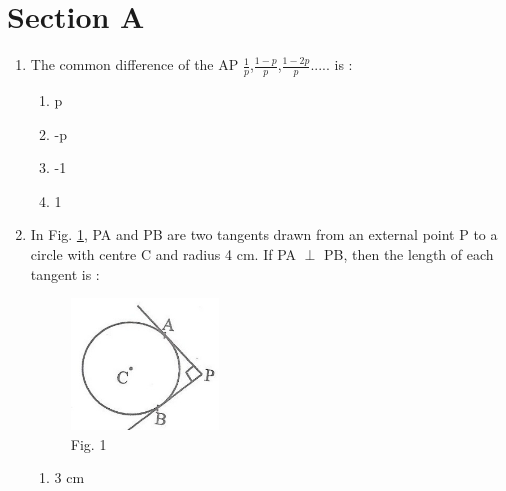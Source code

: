 \documentclass[journal,12pt,twocolumn]{IEEEtran}
\renewcommand\thesection{\arabic{section}}
\begin{document}
\section{Section A}
\renewcommand{\theequation}{\theenumi}
\begin{enumerate}[label=\thesection.\arabic*.,ref=\thesection.\theenumi]
\item The common difference of the AP $\frac{1}{p}$,$\frac{1-p}{p}$,$\frac{1-2p}{p}$..... is :
 \begin{enumerate}
    \item p\\
    \item -p\\
    \item -1\\
    \item 1 \\
 \end{enumerate}
\item In Fig. \ref{fig1}, PA and PB are two tangents drawn from an external point P to a
circle with centre C and radius 4 cm. If PA $\perp$ PB, then the length of each
tangent is :
		\begin{figure}
			\centering
			\includegraphics[width=\columnwidth]{1.png}
\caption{Fig. 1}
    \label{fig1}
		\end{figure}
 \begin{enumerate}
    \item 3 cm\\

\end{enumerate}
\end{enumerate}
\end{document}
